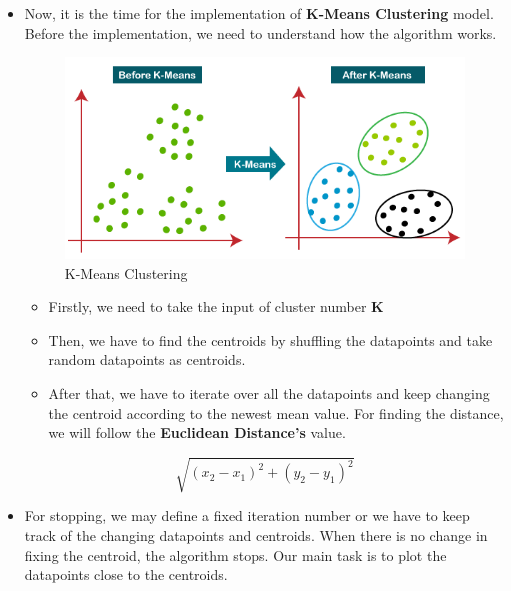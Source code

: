 \documentclass[conference]{IEEEtran}
\begin{document}
\begin{itemize}
\item Now, it is the time for the implementation of  \textbf{K-Means Clustering} model. Before the implementation, we need to understand how the algorithm works.\\
\begin{figure}[htb!]
\centerline{\includegraphics[scale=0.45]{52.png}}
\caption{K-Means Clustering\\}
\label{fig}
\end{figure}
   \begin{itemize}
     \item Firstly, we need to take the input of cluster number \textbf{K}
     \item Then, we have to find the centroids by shuffling the datapoints and take random datapoints as centroids.
	\item After that, we have to iterate over all the datapoints and keep changing the centroid according to the newest mean value. For finding the distance, we will follow the \textbf{Euclidean Distance's} value.
   \end{itemize}
\begin{equation}
\sqrt{\left(x_{2}-x_{1}\right)^{2}+\left(y_{2}-y_{1}\right)^{2}}
\end{equation}
	\item For stopping, we may define a fixed iteration number or we have to keep track of the changing datapoints and centroids. When there is no change in fixing the centroid, the algorithm stops.
Our main task is to plot the datapoints close to the centroids.




\end{itemize}
\end{document}
